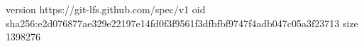 version https://git-lfs.github.com/spec/v1
oid sha256:e2d076877ae329e22197e14fd0f3f9561f3dfbfbf9747f4adb047c05a3f23713
size 1398276
